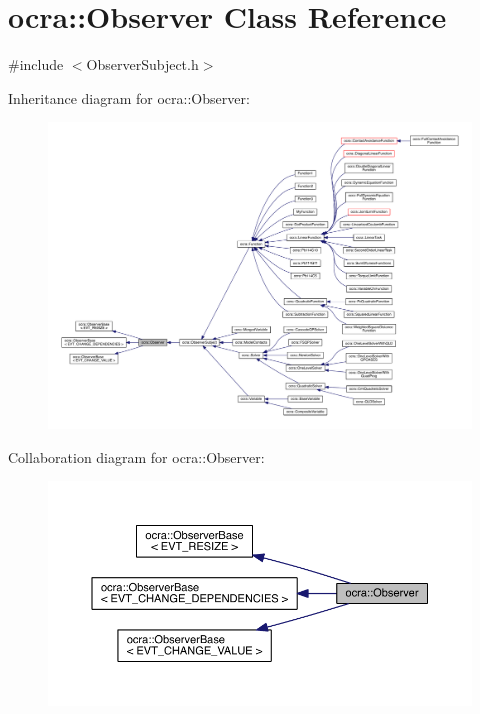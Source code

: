 \hypertarget{classocra_1_1Observer}{}\section{ocra\+:\+:Observer Class Reference}
\label{classocra_1_1Observer}


{\ttfamily \#include $<$Observer\+Subject.\+h$>$}



Inheritance diagram for ocra\+:\+:Observer\+:\nopagebreak
\begin{figure}[H]
\begin{center}
\leavevmode
\includegraphics[width=350pt]{d8/dea/classocra_1_1Observer__inherit__graph}
\end{center}
\end{figure}


Collaboration diagram for ocra\+:\+:Observer\+:\nopagebreak
\begin{figure}[H]
\begin{center}
\leavevmode
\includegraphics[width=350pt]{d2/d40/classocra_1_1Observer__coll__graph}
\end{center}
\end{figure}
